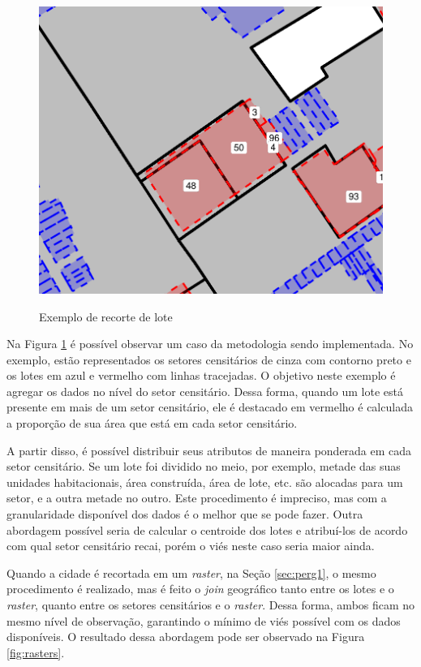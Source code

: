 \begin{apendicesenv}
\begin{figure}[h]
    \centering
    \caption{Exemplo de recorte de lote}
    \includegraphics[width = .75\linewidth]{figuras/corte_lote.pdf}
    \label{fig:corte-lote}
\end{figure}

Na Figura \ref{fig:corte-lote} é possível observar um caso da metodologia sendo implementada. No exemplo, estão representados os setores censitários de cinza com contorno preto e os lotes em azul e vermelho com linhas tracejadas. O objetivo neste exemplo é agregar os dados no nível do setor censitário. Dessa forma, quando um lote está presente em mais de um setor censitário, ele é destacado em vermelho é calculada a proporção de sua área que está em cada setor censitário.

A partir disso, é possível distribuir seus atributos de maneira ponderada em cada setor censitário. Se um lote foi dividido no meio, por exemplo, metade das suas unidades habitacionais, área construída, área de lote, etc. são alocadas para um setor, e a outra metade no outro. Este procedimento é impreciso, mas com a granularidade disponível dos dados é o melhor que se pode fazer. Outra abordagem possível seria de calcular o centroide dos lotes e atribuí-los de acordo com qual setor censitário recai, porém o viés neste caso seria maior ainda.

Quando a cidade é recortada em um \textit{raster}, na Seção \ref{sec:perg1}, o mesmo procedimento é realizado, mas é feito o \textit{join} geográfico tanto entre os lotes e o \textit{raster}, quanto entre os setores censitários e o \textit{raster}. Dessa forma, ambos ficam no mesmo nível de observação, garantindo o mínimo de viés possível com os dados disponíveis. O resultado dessa abordagem pode ser observado na Figura \ref{fig:rasters}.


\end{apendicesenv}
